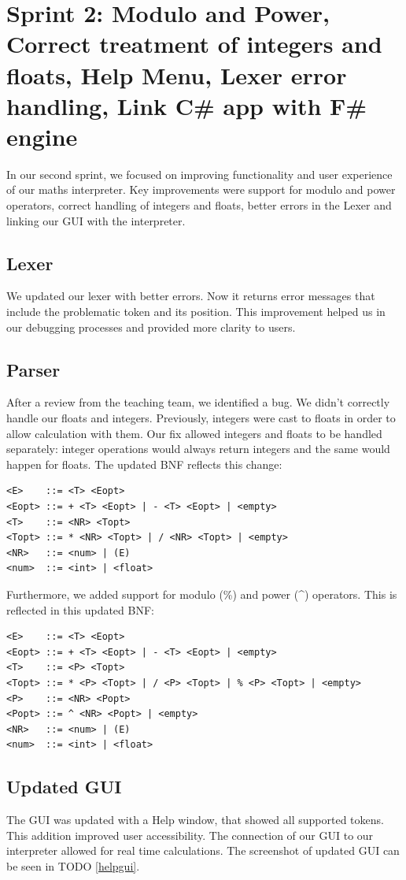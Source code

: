 \documentclass[a4paper, oneside, 11pt]{report}
\begin{document}
\section{Sprint 2: Modulo and Power, Correct treatment of integers and floats, Help Menu, Lexer error handling, Link C\# app with F\# engine}

In our second sprint, we focused on improving functionality and user experience of our maths interpreter. Key improvements were support for modulo and power operators, correct handling of integers and floats, better errors in the Lexer and linking our GUI with the interpreter.

\subsection{Lexer}
We updated our lexer with better errors. Now it returns error messages that include the problematic token and its position. This improvement helped us in our debugging processes and provided more clarity to users.

\subsection{Parser}
After a review from the teaching team, we identified a bug. We didn't correctly handle our floats and integers. Previously, integers were cast to floats in order to allow calculation with them. Our fix allowed integers and floats to be handled separately: integer operations would always return integers and the same would happen for floats. The updated BNF reflects this change:
\begin{verbatim}
<E>    ::= <T> <Eopt>
<Eopt> ::= + <T> <Eopt> | - <T> <Eopt> | <empty>
<T>    ::= <NR> <Topt>
<Topt> ::= * <NR> <Topt> | / <NR> <Topt> | <empty>
<NR>   ::= <num> | (E)
<num>  ::= <int> | <float>
\end{verbatim}

Furthermore, we added support for modulo (\%) and power (\textasciicircum) operators. This is reflected in this updated BNF:
\begin{verbatim}
<E>    ::= <T> <Eopt>
<Eopt> ::= + <T> <Eopt> | - <T> <Eopt> | <empty>
<T>    ::= <P> <Topt>
<Topt> ::= * <P> <Topt> | / <P> <Topt> | % <P> <Topt> | <empty>
<P>    ::= <NR> <Popt>
<Popt> ::= ^ <NR> <Popt> | <empty>
<NR>   ::= <num> | (E)
<num>  ::= <int> | <float>
\end{verbatim}


\subsection{Updated GUI}
The GUI was updated with a Help window, that showed all supported tokens. This addition improved user accessibility. The connection of our GUI to our interpreter allowed for real time calculations. The screenshot of updated GUI can be seen in TODO \ref{helpgui}.
\end{document}
